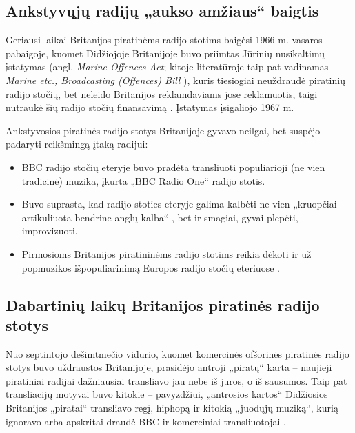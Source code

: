 \documentclass[kursinis-darbas]{vukf}
\begin{document}
\subsection{Ankstyvųjų radijų „aukso amžiaus“ baigtis}

Geriausi laikai Britanijos piratinėms radijo stotims baigėsi 1966 m. vasaros pabaigoje, kuomet Didžiojoje Britanijoje buvo priimtas Jūrinių nusikaltimų įstatymas (angl. \emph{Marine Offences Act}; kitoje literatūroje taip pat vadinamas \emph{Marine etc., Broadcasting (Offences) Bill} \cite[p.~139]{hc_key_concepts_in_radio_studies}), kuris tiesiogiai neuždraudė piratinių radijo stočių, bet neleido Britanijos reklamdaviams jose reklamuotis, taigi nutraukė šių radijo stočių finansavimą \cite[p.~238]{chs_encyclopedia_of_radio}. Įstatymas įsigaliojo 1967 m.

Ankstyvosios piratinės radijo stotys Britanijoje gyvavo neilgai, bet suspėjo padaryti reikšmingą įtaką radijui:

\begin{itemize}
	\item \gls{BBC} radijo stočių eteryje buvo pradėta transliuoti populiarioji (ne vien tradicinė) muzika, įkurta „\gls{BBC} Radio One“ radijo stotis.
	\item Buvo suprasta, kad radijo stoties eteryje galima kalbėti ne vien „kruopčiai artikuliuota bendrine anglų kalba“ \cite[p.~238]{chs_encyclopedia_of_radio}, bet ir smagiai, gyvai plepėti, improvizuoti.
	\item Pirmosioms Britanijos piratininėms radijo stotims reikia dėkoti ir už popmuzikos išpopuliarinimą Europos radijo stočių eteriuose \cite[p.~447]{js_continuum_encyclopedia}.
\end{itemize}


\subsection{Dabartinių laikų Britanijos piratinės radijo stotys}

Nuo septintojo dešimtmečio vidurio, kuomet komercinės ofšorinės piratinės radijo stotys buvo uždraustos Britanijoje, prasidėjo antroji „piratų“ karta – naujieji piratiniai radijai dažniausiai transliavo jau nebe iš jūros, o iš sausumos. Taip pat transliacijų motyvai buvo kitokie \cite[p.~448]{js_continuum_encyclopedia} – pavyzdžiui, „antrosios kartos“ Didžiosios Britanijos „piratai“ transliavo regį, hiphopą ir kitokią „juodųjų muziką“, kurią ignoravo arba apskritai draudė \gls{BBC} ir komerciniai transliuotojai \cite[p.~447]{js_continuum_encyclopedia}.
\end{document}
